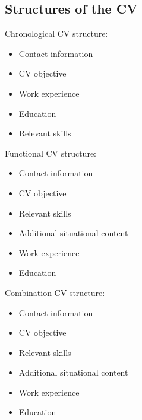 \subsection{Structures of the CV}
Chronological CV structure:
\begin{itemize}
   \item  Contact information
   \item  CV objective
   \item  Work experience
   \item  Education
   \item  Relevant skills
   \end{itemize}


Functional CV structure:
\begin{itemize}
   \item  Contact information
   \item  CV objective
   \item  Relevant skills
   \item  Additional situational content
   \item  Work experience
   \item  Education
   \end{itemize}

Combination CV structure:
\begin{itemize}
   \item  Contact information
   \item  CV objective
   \item  Relevant skills
   \item  Additional situational content
   \item  Work experience
   \item  Education
   \end{itemize}
